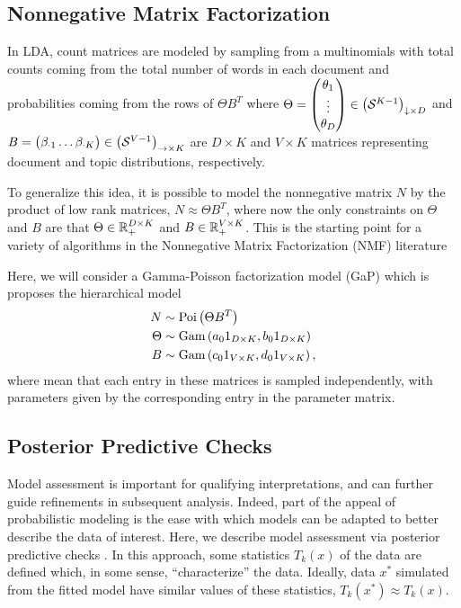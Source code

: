 \documentclass[oupdraft]{bio}
\begin{document}
\subsection{Nonnegative Matrix Factorization}
\label{sec:nmf}

In LDA, count matrices are modeled by sampling from a multinomials with total
counts coming from the total number of words in each document and probabilities
coming from the rows of $\Theta B^{T}$ where $\Theta = \begin{pmatrix}\theta_{1}
  \\ \vdots \\ \theta_{D} \end{pmatrix} \in \left(\mathcal{S}^{K -
  1}\right)_{\downarrow \times D}$ and $B = \begin{pmatrix} \beta_{\cdot 1}
  \dots \beta_{\cdot K} \end{pmatrix} \in \left(\mathcal{S}^{V -
  1}\right)_{\rightarrow \times K}$ are $D \times K$ and $V \times K$ matrices
representing document and topic distributions, respectively.


To generalize this idea, it is possible to model the nonnegative matrix $N$
by the product of low rank matrices, $N \approx \Theta B^{T}$, where now the
only constraints on $\Theta$ and $B$ are that $\Theta \in \mathbb{R}_{+}^{D \times
  K}$ and $B \in \mathbb{R}_{+}^{V \times K}$. This is the starting point for a
variety of algorithms in the Nonnegative Matrix Factorization (NMF) literature
\citep{wang2013nonnegative, berry2007algorithms, lee2001algorithms}

Here, we will consider a Gamma-Poisson factorization model (GaP)
\citep{kucukelbir2015automatic, canny2004gap} which is proposes the hierarchical
model
\begin{align*}
N &\sim \textnormal{Poi}\left(\Theta B^{T}\right) \\
\Theta &\sim \textnormal{Gam}\left(a_{0} 1_{D \times K}, b_{0} 1_{D \times K}\right) \\
B &\sim \textnormal{Gam}\left(c_{0} 1_{V \times K}, d_{0} 1_{V \times K} \right),
\end{align*}
where mean that each entry in these matrices is sampled independently, with
parameters given by the corresponding entry in the parameter matrix.

\subsection{Posterior Predictive Checks}

Model assessment is important for qualifying interpretations, and can further
guide refinements in subsequent analysis. Indeed, part of the appeal of
probabilistic modeling is the ease with which models can be adapted to better
describe the data of interest. Here, we describe model assessment via posterior
predictive checks \citep{rubin1984bayesianly, gelman2013philosophy}. In this
approach, some statistics $T_{k}\left(x\right)$ of the data are defined which,
in some sense, ``characterize'' the data. Ideally, data $x^{\ast}$ simulated
from the fitted model have similar values of these statistics,
$T_{k}\left(x^{\ast}\right) \approx T_{k}\left(x\right)$.
\end{document}
